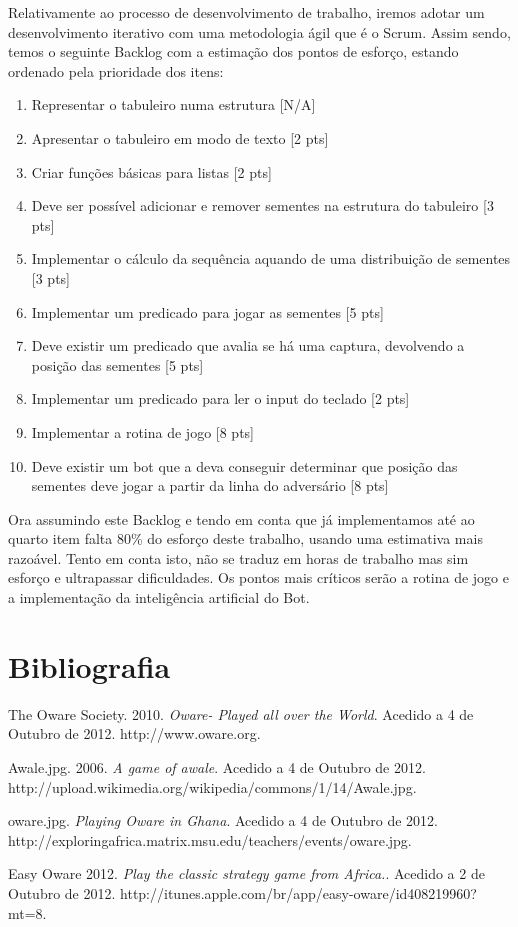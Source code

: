 \documentclass[15pt,a4paper]{article}
\begin{document}
\indent Relativamente ao processo de desenvolvimento de trabalho, iremos adotar um desenvolvimento iterativo com uma metodologia ágil que é o Scrum. Assim sendo, temos o seguinte Backlog com a estimação dos pontos de esforço, estando ordenado pela prioridade dos itens:

\begin{enumerate}
  \item Representar o tabuleiro numa estrutura [N/A]
  \item Apresentar o tabuleiro em modo de texto [2 pts]
  \item Criar funções básicas para listas [2 pts]
  \item Deve ser possível adicionar e remover sementes na estrutura do tabuleiro [3 pts]
  \item Implementar o cálculo da sequência aquando de uma distribuição de sementes [3 pts]
  \item Implementar um predicado para jogar as sementes [5 pts]
  \item Deve existir um predicado que avalia se há uma captura, devolvendo a posição das sementes [5 pts]
  \item Implementar um predicado para ler o input do teclado [2 pts]
  \item Implementar a rotina de jogo [8 pts]
  \item Deve existir um bot que a deva conseguir determinar que posição das sementes deve jogar a partir da linha do adversário [8 pts]
\end{enumerate}

Ora assumindo este Backlog e tendo em conta que já implementamos até ao quarto item falta 80\% do esforço deste trabalho, usando uma estimativa mais razoável. Tento em conta isto, não se traduz em horas de trabalho mas sim esforço e ultrapassar dificuldades. Os pontos mais críticos serão a rotina de jogo e a implementação da inteligência artificial do Bot.
\newpage
\section{Bibliografia}
\begin{thebibliography}{9}

  The Oware Society.
  2010.
  \emph{ Oware- Played all over the World}.
  Acedido a 4 de Outubro de 2012.
  http://www.oware.org.
  
  Awale.jpg.
  2006.
  \emph{A game of awale}.
  Acedido a 4 de Outubro de 2012.
  http://upload.wikimedia.org/wikipedia/commons/1/14/Awale.jpg.
  
	oware.jpg.
  \emph{Playing Oware in Ghana}.
  Acedido a 4 de Outubro de 2012.
  http://exploringafrica.matrix.msu.edu/teachers/events/oware.jpg.
  
	Easy Oware
	2012.
  \emph{Play the classic strategy game from Africa.}.
  Acedido a 2 de Outubro de 2012.
  http://itunes.apple.com/br/app/easy-oware/id408219960?mt=8.

\end{thebibliography}
\end{document}
